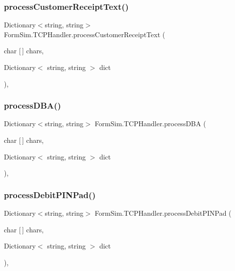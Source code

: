 \subsubsection{\texorpdfstring{process\+Customer\+Receipt\+Text()}{processCustomerReceiptText()}}
{\footnotesize\ttfamily Dictionary$<$string, string$>$ Form\+Sim.\+T\+C\+P\+Handler.\+process\+Customer\+Receipt\+Text (\begin{DoxyParamCaption}\item[{char \mbox{[}$\,$\mbox{]}}]{chars,  }\item[{Dictionary$<$ string, string $>$}]{dict }\end{DoxyParamCaption})\hspace{0.3cm}{\ttfamily [inline]}, {\ttfamily [private]}}

\mbox{\label{class_form_sim_1_1_t_c_p_handler_ac7fbe43d4623f2e14fc97882986e77c9}} 
\subsubsection{\texorpdfstring{process\+D\+B\+A()}{processDBA()}}
{\footnotesize\ttfamily Dictionary$<$string, string$>$ Form\+Sim.\+T\+C\+P\+Handler.\+process\+D\+BA (\begin{DoxyParamCaption}\item[{char \mbox{[}$\,$\mbox{]}}]{chars,  }\item[{Dictionary$<$ string, string $>$}]{dict }\end{DoxyParamCaption})\hspace{0.3cm}{\ttfamily [inline]}, {\ttfamily [private]}}

\mbox{\label{class_form_sim_1_1_t_c_p_handler_abee335961452418d460a7ae488ae3eb0}} 
\subsubsection{\texorpdfstring{process\+Debit\+P\+I\+N\+Pad()}{processDebitPINPad()}}
{\footnotesize\ttfamily Dictionary$<$string, string$>$ Form\+Sim.\+T\+C\+P\+Handler.\+process\+Debit\+P\+I\+N\+Pad (\begin{DoxyParamCaption}\item[{char \mbox{[}$\,$\mbox{]}}]{chars,  }\item[{Dictionary$<$ string, string $>$}]{dict }\end{DoxyParamCaption})\hspace{0.3cm}{\ttfamily [inline]}, {\ttfamily [private]}}


